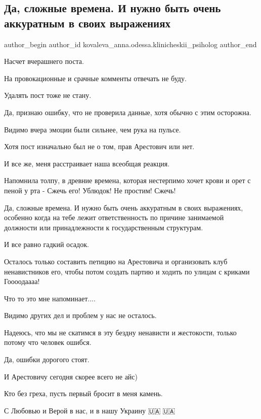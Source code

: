  
 
 
 
 

\subsection{Да, сложные времена. И нужно быть очень аккуратным в своих выражениях}
\label{sec:15_01_2023.fb.kovaleva_anna.odessa.klinicheskii_psiholog.1.da__slozhnie_vremena}

\ifcmt
 author_begin
   author_id kovaleva_anna.odessa.klinicheskii_psiholog
 author_end
\fi

Насчет вчерашнего поста.

На провокационные и срачные комменты отвечать не буду.

Удалять пост тоже не стану.

Да, признаю ошибку, что не проверила данные, хотя обычно с этим осторожна.

Видимо вчера эмоции были сильнее, чем рука на пульсе.

Хотя пост изначально был не о том, прав Арестович или нет.

И все же, меня расстраивает наша всеобщая реакция.

Напомнила толпу, в древние времена, которая нестерпимо хочет крови и орет с
пеной у рта - Сжечь его! Ублюдок! Не простим! Сжечь!

Да, сложные времена. И нужно быть очень аккуратным в своих выражениях, особенно
когда на тебе лежит ответственность по причине занимаемой должности или
принадлежности к государственным структурам.

И все равно гадкий осадок.

Осталось только составить петицию на Арестовича и организовать клуб
ненавистников его, чтобы потом создать партию и ходить по улицам с криками
Гоооодаааа!

Что то это мне напоминает....

Видимо других дел и проблем у нас не осталось.

Надеюсь, что мы не скатимся в эту бездну ненависти и жестокости, только потому
что человек ошибся.

Да, ошибки дорогого стоят.

И Арестовичу сегодня скорее всего не айс)

Кто без греха, пусть первый бросит в меня камень.

С Любовью и Верой в нас, и в нашу Украину 🇺🇦💛🇺🇦💙
